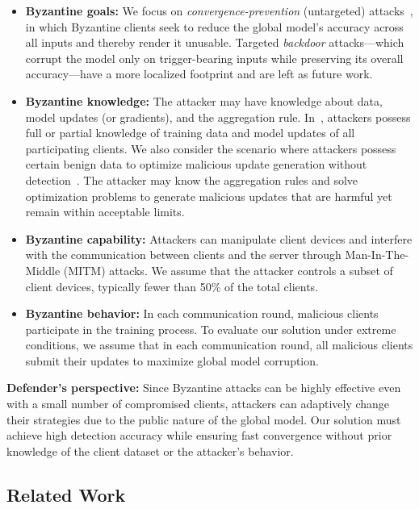 \documentclass[journal]{IEEEtran}
\begin{document}
\begin{itemize}
    \item \textbf{Byzantine goals:} We focus on \textit{convergence-prevention} (untargeted) attacks~\cite{baruch2019little, shejwalkar2021manipulating}, in which Byzantine clients seek to reduce the global model's accuracy across all inputs and thereby render it unusable. Targeted \textit{backdoor} attacks---which corrupt the model only on trigger-bearing inputs while preserving its overall accuracy---have a more localized footprint and are left as future work.

    \item \textbf{Byzantine knowledge:} The attacker may have knowledge about data, model updates (or gradients), and the aggregation rule. In~\cite{baruch2019little, fang2020local}, attackers possess full or partial knowledge of training data and model updates of all participating clients. We also consider the scenario where attackers possess certain benign data to optimize malicious update generation without detection~\cite{shejwalkar2021manipulating}. The attacker may know the aggregation rules and solve optimization problems to generate malicious updates that are harmful yet remain within acceptable limits.

    \item \textbf{Byzantine capability:} Attackers can manipulate client devices and interfere with the communication between clients and the server through Man-In-The-Middle (MITM) attacks. We assume that the attacker controls a subset of client devices, typically fewer than 50\% of the total clients.

    \item \textbf{Byzantine behavior:} In each communication round, malicious clients participate in the training process. To evaluate our solution under extreme conditions, we assume that in each communication round, all malicious clients submit their updates to maximize global model corruption.
\end{itemize}

\noindent\textbf{Defender's perspective:} Since Byzantine attacks can be highly effective even with a small number of compromised clients, attackers can adaptively change their strategies due to the public nature of the global model. Our solution must achieve high detection accuracy while ensuring fast convergence without prior knowledge of the client dataset or the attacker's behavior.

\subsection{Related Work}
\end{document}
